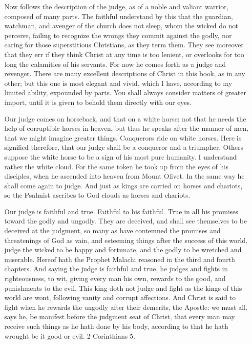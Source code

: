 Now follows the description of the judge, as of a noble and valiant warrior, composed of many parts. The faithful understand by this that the guardian, watchman, and avenger of the church does not sleep, whom the wicked do not perceive, failing to recognize the wrongs they commit against the godly, nor caring for those superstitious Christians, as they term them. They see moreover that they err if they think Christ at any time is too lenient, or overlooks for too long the calamities of his servants. For now he comes forth as a judge and revenger. There are many excellent descriptions of Christ in this book, as in any other; but this one is most elegant and vivid, which I have, according to my limited ability, expounded by parts. You shall always consider matters of greater import, until it is given to behold them directly with our eyes.

Our judge comes on horseback, and that on a white horse: not that he needs the help of corruptible horses in heaven, but thus he speaks after the manner of men, that we might imagine greater things. Conquerors ride on white horses. Here is signified therefore, that our judge shall be a conqueror and a triumpher. Others suppose the white horse to be a sign of his most pure humanity. I understand rather the white cloud. For the same token he took up from the eyes of his disciples, when he ascended into heaven from Mount Olivet. In the same way he shall come again to judge. And just as kings are carried on horses and chariots, so the Psalmist ascribes to God clouds as horses and chariots.

Our judge is faithful and true. Faithful to his faithful. True in all his promises toward the godly and ungodly. They are deceived, and shall see themselves to be deceived at the judgment, so many as have contemned the promises and threatenings of God as vain, and esteeming things after the success of this world, judge the wicked to be happy and fortunate, and the godly to be wretched and miserable. Hereof hath the Prophet Malachi reasoned in the third and fourth chapters. And saying the judge is faithful and true, he judges and fights in righteousness, to wit, giving every man his own, rewards to the good, and punishments to the evil. This king doth not judge and fight as the kings of this world are wont, following vanity and corrupt affections. And Christ is said to fight when he rewards the ungodly after their demerits, the Apostle: we must all, says he, be manifest before the judgment seat of Christ, that every man may receive such things as he hath done by his body, according to that he hath wrought be it good or evil. 2 Corinthians 5.

